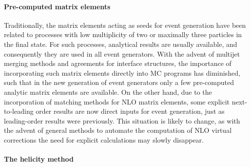 \paragraph{Pre-computed matrix elements} 

Traditionally, the matrix elements acting as seeds for event generation have
been related to processes with low multiplicity of two or maximally three
particles in the final state.  For such processes, analytical results are
usually available, and consequently they are used in all event generators.
With the advent of multijet merging methods and agreements for interface
structures, the importance of incorporating such matrix elements directly
into MC programs has diminished, such that in the new generation of 
event generators only a few pre-computed analytic matrix elements are available.
On the other hand, due to the incorporation of matching methods for NLO 
matrix elements, some explicit next-to-leading order results are now direct
inputs for event generation, just as leading-order results were previously.
This situation is likely to change, as with the advent of general methods
to automate the computation of NLO virtual corrections the need for explicit
calculations may slowly disappear. 

\paragraph{The helicity method}

